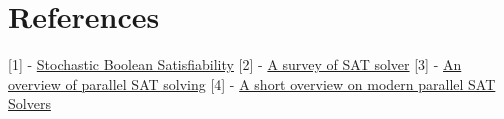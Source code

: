 \documentclass{article}
\begin{document}
\section{References}

[1] - \href{https://link.springer.com/article/10.1023/A:1017584715408}{Stochastic Boolean Satisfiability}
[2] - \href{https://doi.org/10.1063/1.4981999}{A survey of SAT solver}
[3] - \href{https://link.springer.com/article/10.1007/s10601-012-9121-3}{An overview of parallel SAT solving}
[4] - \href{https://www.researchgate.net/publication/254048189_A_short_overview_on_modern_parallel_SAT-solvers}{A short overview on modern parallel SAT Solvers}
\end{document}
